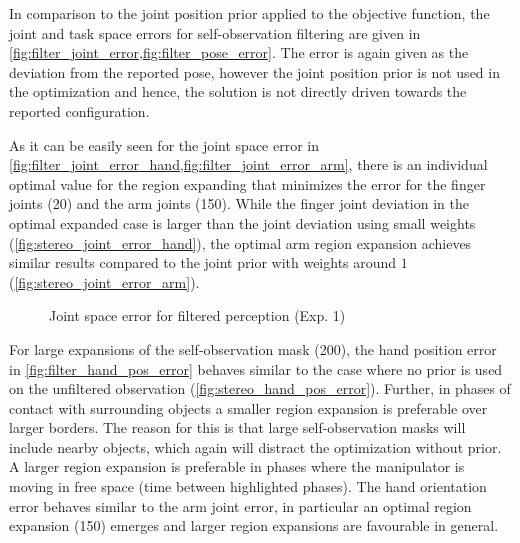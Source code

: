 In comparison to the joint position prior applied to the objective function, the joint and task space errors for self-observation filtering are given in \cref{fig:filter_joint_error,fig:filter_pose_error}. The error is again given as the deviation from the reported pose, however the joint position prior is not used in the optimization and hence, the solution is not directly driven towards the reported configuration.

As it can be easily seen for the joint space error in \cref{fig:filter_joint_error_hand,fig:filter_joint_error_arm}, there is an individual optimal value for the region expanding that minimizes the error for the finger joints (20) and the arm joints (150). While the finger joint deviation in the optimal expanded case is larger than the joint deviation using small weights (\cref{fig:stereo_joint_error_hand}), the optimal arm region expansion achieves similar results compared to the joint prior with weights around $1$ (\cref{fig:stereo_joint_error_arm}).

\begin{figure}[h]
\centering
{}
\caption{Joint space error for filtered perception (Exp. 1)}
\label{fig:filter_joint_error}
\end{figure}

For large expansions of the self-observation mask (200), the hand position error in \cref{fig:filter_hand_pos_error} behaves similar to the case where no prior is used on the unfiltered observation (\cref{fig:stereo_hand_pos_error}). Further, in phases of contact with surrounding objects a smaller region expansion is preferable over larger borders. The reason for this is that large self-observation masks will include nearby objects, which again will distract the optimization without prior. A larger region expansion is preferable in phases where the manipulator is moving in free space (time between highlighted phases).
The hand orientation error behaves similar to the arm joint error, in particular an optimal region expansion (150) emerges and larger region expansions are favourable in general.

